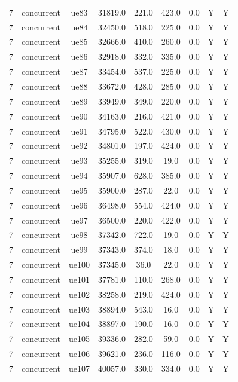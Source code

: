 \begin{table}[ht]
\begin{tabular}{|c|c|c|c|c|c|c|c|c|}
7 & concurrent & ue83 & 31819.0 & 221.0 & 423.0 & 0.0 & Y & Y \\
7 & concurrent & ue84 & 32450.0 & 518.0 & 225.0 & 0.0 & Y & Y \\
7 & concurrent & ue85 & 32666.0 & 410.0 & 260.0 & 0.0 & Y & Y \\
7 & concurrent & ue86 & 32918.0 & 332.0 & 335.0 & 0.0 & Y & Y \\
7 & concurrent & ue87 & 33454.0 & 537.0 & 225.0 & 0.0 & Y & Y \\
7 & concurrent & ue88 & 33672.0 & 428.0 & 285.0 & 0.0 & Y & Y \\
7 & concurrent & ue89 & 33949.0 & 349.0 & 220.0 & 0.0 & Y & Y \\
7 & concurrent & ue90 & 34163.0 & 216.0 & 421.0 & 0.0 & Y & Y \\
7 & concurrent & ue91 & 34795.0 & 522.0 & 430.0 & 0.0 & Y & Y \\
7 & concurrent & ue92 & 34801.0 & 197.0 & 424.0 & 0.0 & Y & Y \\
7 & concurrent & ue93 & 35255.0 & 319.0 & 19.0 & 0.0 & Y & Y \\
7 & concurrent & ue94 & 35907.0 & 628.0 & 385.0 & 0.0 & Y & Y \\
7 & concurrent & ue95 & 35900.0 & 287.0 & 22.0 & 0.0 & Y & Y \\
7 & concurrent & ue96 & 36498.0 & 554.0 & 424.0 & 0.0 & Y & Y \\
7 & concurrent & ue97 & 36500.0 & 220.0 & 422.0 & 0.0 & Y & Y \\
7 & concurrent & ue98 & 37342.0 & 722.0 & 19.0 & 0.0 & Y & Y \\
7 & concurrent & ue99 & 37343.0 & 374.0 & 18.0 & 0.0 & Y & Y \\
7 & concurrent & ue100 & 37345.0 & 36.0 & 22.0 & 0.0 & Y & Y \\
7 & concurrent & ue101 & 37781.0 & 110.0 & 268.0 & 0.0 & Y & Y \\
7 & concurrent & ue102 & 38258.0 & 219.0 & 424.0 & 0.0 & Y & Y \\
7 & concurrent & ue103 & 38894.0 & 543.0 & 16.0 & 0.0 & Y & Y \\
7 & concurrent & ue104 & 38897.0 & 190.0 & 16.0 & 0.0 & Y & Y \\
7 & concurrent & ue105 & 39336.0 & 282.0 & 59.0 & 0.0 & Y & Y \\
7 & concurrent & ue106 & 39621.0 & 236.0 & 116.0 & 0.0 & Y & Y \\
7 & concurrent & ue107 & 40057.0 & 330.0 & 334.0 & 0.0 & Y & Y \\

\end{tabular}
\end{table}
